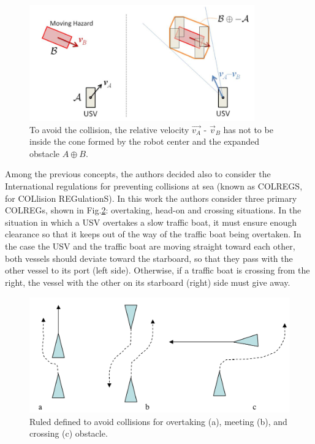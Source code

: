 \documentclass[12pt]{article}
\begin{document}
              \begin{figure}
                    \centering
                    \includegraphics[height=5cm]{./Images/Kuwata/obs_vel}
                    \caption{To avoid the collision, the relative velocity $\vec{v_A}$ - $\vec{v}_B$ has not to be inside the cone formed by the robot center and the expanded obstacle $A\oplus B$.}
                    \label{fig:obs_vel}
              \end{figure}

              Among the previous concepts, the authors decided also to consider the International regulations for preventing collisions at sea (known as COLREGS, for COLlision REGulationS). In this work the authors consider three primary COLREGs, shown in Fig.\ref{fig:colregs}: overtaking, head-on and crossing situations. In the situation in which a USV overtakes a slow traffic boat, it must ensure enough clearance so that it keeps out of the way of the traffic boat being overtaken. In the case the USV and the traffic boat are moving straight toward each other, both vessels should deviate toward the starboard, so that they pass with the other vessel to its port (left side). Otherwise, if a traffic boat is crossing from the right, the vessel with the other on its starboard (right) side must give away.\\

              \begin{figure}
                    \centering
                    \includegraphics[height=5cm]{./Images/Larson/colregs}
                    \caption{Ruled defined to avoid collisions for overtaking (a), meeting (b), and crossing (c) obstacle.}
                    \label{fig:colregs}
              \end{figure}
\end{document}
